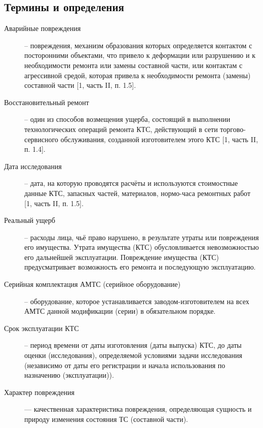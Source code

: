 \subsection{Термины и определения}
\begin{description}
	\item[Аварийные повреждения] -- повреждения, механизм образования которых определяется контактом с посторонними объектами, что привело к деформации или разрушению и к необходимости ремонта или замены составной части, или контактам с агрессивной средой, которая привела к необходимости ремонта (замены) составной части [1, часть II, п. 1.5].
	\item[Восстановительный ремонт]-- один из способов возмещения ущерба, состоящий в выполнении технологических операций ремонта КТС, действующий в сети торгово-сервисного обслуживания, созданной изготовителем этого КТС [1, часть II, п. 1.4].
	\item[Дата исследования ]-- дата, на которую проводятся расчёты и используются стоимостные данные КТС, запасных частей, материалов, нормо-часа ремонтных работ [1, часть II, п. 1.5].
	
		\item[Реальный ущерб] -- расходы лица, чьё право нарушено, в результате утраты или повреждения его имущества. Утрата имущества (КТС) обусловливается невозможностью его дальнейшей эксплуатации. Повреждение имущества (КТС) предусматривает возможность его ремонта и последующую эксплуатацию.
		
			
		\item[Серийная комплектация  АМТС (серийное оборудование)] -- оборудование, которое устанавливается заводом-изготовителем на всех АМТС данной модификации (серии) в обязательном порядке. 
		
	
	\item[Срок эксплуатации КТС]-- период времени от даты изготовления (даты выпуска) КТС, до даты оценки (исследования), определяемой условиями задачи исследования (независимо от даты его регистрации и начала использования по назначению (эксплуатации)).

	
\item[Характер повреждения]--- качественная характеристика повреждения, определяющая сущность и природу изменения состояния ТС (составной части).
	


\end{description}
